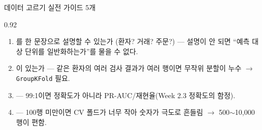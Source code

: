 \begin{frame}{데이터 고르기 실전 가이드 5개}
\begin{center}\begin{varwidth}{0.92\textwidth}
  
  \begin{enumerate}
    \item {}를 한 문장으로 설명할 수 있는가
      (환자? 거래? 주문?) --- 설명이 안 되면 ``예측 대상 단위를
      일반화하는가''를 물을 수 없다.
    \item {}이 있는가 --- 같은 환자의 여러 검사
      결과가 여러 행이면 무작위 분할이 누수 $\to$
      \texttt{GroupKFold} 필요.
    
    \item {} --- 99:1이면
      정확도가 아니라 PR-AUC/재현율(Week 2.3 정확도의 함정).
    \item {} --- 100행 미만이면 CV 폴드가 너무 작아 숫자가
      극도로 흔들림 $\to$ 500$\sim$10{,}000행이 편함.
  \end{enumerate}
\end{varwidth}\end{center}
\end{frame}
